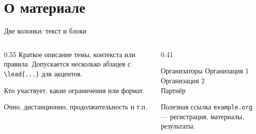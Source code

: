 \section{О материале}

\begin{frame}{Две колонки: текст и блоки}
  \begin{columns}[T]
    \begin{column}{0.55\textwidth}
       Краткое описание темы, контекста или правила.
      Допускается несколько абзацев с \mbox{\texttt{\textbackslash lead\{...\}}} для акцентов.

      \medskip
       Кто участвует, какие ограничения или формат.

      \medskip
       Очно, дистанционно, продолжительность и т.п.
    \end{column}
    \begin{column}{0.41\textwidth}
      \begin{block}{Организаторы}
        Организация 1\\[0.35em]
        Организация 2\\[0.35em]
        Партнёр
      \end{block}
      \begin{block}{Полезная ссылка}
        \texttt{example.org} --- регистрация, материалы, результаты.
      \end{block}
    \end{column}
  \end{columns}
\end{frame}
